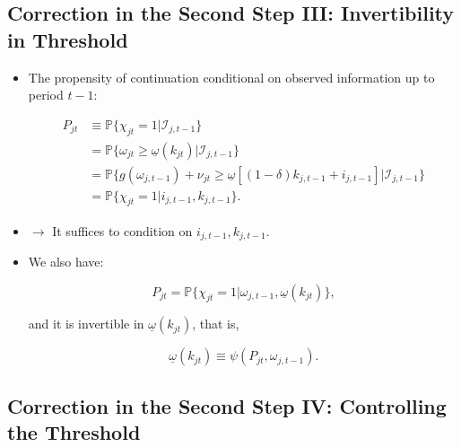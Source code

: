 \documentclass[]{book}
\providecommand{\tightlist}{%
  \setlength{\itemsep}{0pt}\setlength{\parskip}{0pt}}
\theoremstyle{definition}
\theoremstyle{definition}
\theoremstyle{definition}
\theoremstyle{remark}
\begin{document}
\subsection{Correction in the Second Step III: Invertibility in
Threshold}\label{correction-in-the-second-step-iii-invertibility-in-threshold}

\begin{itemize}
\tightlist
\item
  The propensity of continuation conditional on observed information up
  to period \(t - 1\):

  \begin{equation}
  \begin{split}
  P_{jt} &\equiv \mathbb{P}\{\chi_{jt} = 1|\mathcal{I}_{j, t - 1}\}\\
  &= \mathbb{P}\{\omega_{jt} \ge \underline{\omega}(k_{jt}) |\mathcal{I}_{j, t - 1}\}\\
  &= \mathbb{P}\{g(\omega_{j, t - 1}) + \nu_{jt} \ge \underline{\omega}[(1 - \delta) k_{j, t - 1} + i_{j, t - 1}]|\mathcal{I}_{j, t - 1} \}\\
  &= \mathbb{P}\{ \chi_{jt} = 1| i_{j, t - 1}, k_{j, t - 1}\}.
  \end{split}
  \end{equation}
\item
  \(\rightarrow\) It suffices to condition on
  \(i_{j, t - 1}, k_{j, t - 1}\).
\item
  We also have:

  \begin{equation}
  P_{jt} = \mathbb{P}\{\chi_{jt} = 1| \omega_{j, t - 1}, \underline{\omega}(k_{jt})\},
  \end{equation}

  and it is invertible in \(\underline{\omega}(k_{jt})\), that is,

  \begin{equation}
  \underline{\omega}(k_{jt}) \equiv \psi(P_{jt}, \omega_{j, t - 1}).
  \end{equation}
\end{itemize}

\subsection{Correction in the Second Step IV: Controlling the
Threshold}\label{correction-in-the-second-step-iv-controlling-the-threshold}
\end{document}
